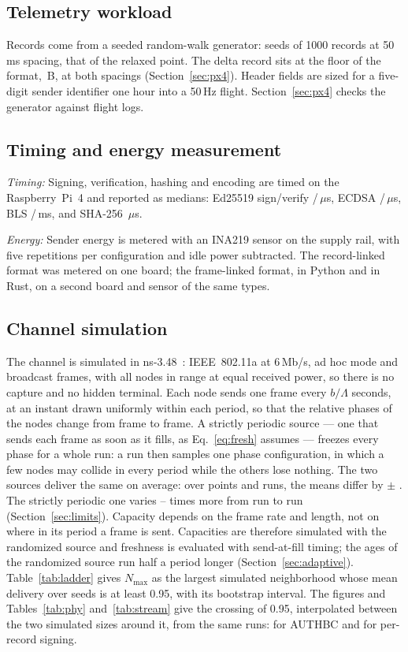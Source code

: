 \documentclass[lineno,pdflatex,sn-mathphys-num]{sn-jnl}
\newcommand{\us}{\,\ensuremath{\mu}s}
\newcommand{\runin}[1]{\textit{#1:}}
\renewcommand{\_}{\authbcunderscore\allowbreak}
\begin{document}
\subsection{Telemetry workload}\label{sec:workload}
Records come from a seeded random-walk generator: \seeds{} seeds of 1000 records at 50\,ms
spacing, that of the relaxed point. The delta record sits at the floor of the format,
\deltaLean\,B, at both spacings (Section~\ref{sec:px4}). Header fields are sized for a five-digit
sender identifier one hour into a 50\,Hz flight. Section~\ref{sec:px4} checks the generator
against flight logs.

\subsection{Timing and energy measurement}\label{sec:measure}
\runin{Timing} Signing, verification, hashing and encoding are timed on the Raspberry~Pi~4 and
reported as medians: Ed25519 sign/verify \tSignEd/\tVerEd\us, ECDSA \tSignEc/\tVerEc\us, BLS
\tSignBls/\tVerBls\,ms, and SHA-256 \tHash\us.

\runin{Energy} Sender energy is metered with an INA219 sensor on the supply rail, with five
repetitions per configuration and idle power subtracted. The record-linked format was metered on
one board; the frame-linked format, in Python and in Rust, on a second board and sensor of the
same types.

\subsection{Channel simulation}\label{sec:sim}
The channel is simulated in ns-3.48~\cite{nsnam}: IEEE~802.11a at 6\,Mb/s, ad hoc mode and
broadcast frames, with all nodes in range at equal received power, so there is no capture and no
hidden terminal. Each node sends one frame every $b/\Lambda$ seconds, at an instant drawn
uniformly within each period, so that the relative phases of the nodes change from frame to
frame. A strictly periodic source --- one that sends each frame as soon as it fills, as
Eq.~\eqref{eq:fresh} assumes --- freezes every phase for a whole run: a run then samples one phase
configuration, in which a few nodes may collide in every period while the others lose nothing.
The two sources deliver the same on average: over \srcPoints{} points and \srcFreshRuns{} runs,
the means differ by \srcFreshD{} $\pm$ \srcFreshSe. The strictly periodic one varies
\srcSpreadLo--\srcSpreadHi{} times more from run to run (Section~\ref{sec:limits}). Capacity
depends on the frame rate and length, not on where in its period a frame is sent. Capacities are
therefore simulated with the randomized source and freshness is evaluated with send-at-fill
timing; the ages of the randomized source run half a period longer
(Section~\ref{sec:adaptive}).
Table~\ref{tab:ladder} gives $N_{\max}$ as the largest simulated neighborhood whose
mean delivery over \seeds{} seeds is at least 0.95, with its bootstrap interval. The figures and
Tables~\ref{tab:phy} and~\ref{tab:stream} give the crossing of 0.95, interpolated between the two
simulated sizes around it, from the same runs: \crossDesign{} \crossCiDesign{} for AUTHBC and
\crossSig{} \crossCiSig{} for per-record signing.
\end{document}
